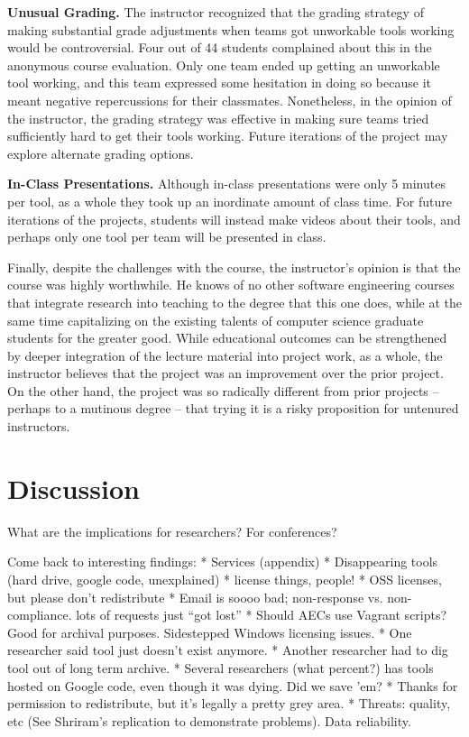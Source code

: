 \documentclass[10pt,conference]{IEEEtran}
\begin{document}
\textbf{Unusual Grading.} 
	The instructor recognized that the grading strategy of making substantial
	grade adjustments when teams got unworkable tools working would be 
	controversial.
	Four out of 44 students complained about this in the anonymous course
	evaluation.
	Only one team ended up getting an unworkable tool working, and this team expressed
	some hesitation in doing so because it meant negative repercussions for their
	classmates.
	Nonetheless, in the opinion of the instructor, the grading strategy was effective
	in making sure teams tried sufficiently hard to get their tools working. 
 	Future iterations of the project may explore alternate grading options.

\textbf{In-Class Presentations.}
  	Although in-class presentations were only 5 minutes per tool, as a whole they
  	took up an inordinate amount of class time.
  	For future iterations of the projects, students will instead make videos 
  	about their tools, and perhaps only one tool per team will be presented
  	in class.
 
\vspace{3mm}
Finally, despite the challenges with the course, the instructor's opinion is that 
the course was highly worthwhile.
He knows of no other software engineering courses that integrate research into 
teaching to the degree that this one does, while at the same time capitalizing
on the existing talents of computer science graduate students for the greater 
good.
While educational outcomes can be strengthened by deeper integration of the lecture
material into project work, as a whole, the instructor believes that 
the project was an improvement over the prior project.
On the other hand, the project was so radically different from prior 
projects -- perhaps to a mutinous degree -- that trying it is a risky 
proposition for untenured instructors.

\section{Discussion}

What are the implications for researchers? For conferences?

Come back to interesting findings:
* Services (appendix)
* Disappearing tools (hard drive, google code, unexplained)
* license things, people!
* OSS licenses, but please don't redistribute
* Email is soooo bad; non-response vs. non-compliance. lots of requests just ``got lost''
* Should AECs use Vagrant scripts? Good for archival purposes. Sidestepped Windows licensing issues.
* One researcher said tool just doesn't exist anymore.
* Another researcher had to dig tool out of long term archive.
* Several researchers (what percent?) has tools hosted on Google code, even though it was dying. Did we save 'em?
* Thanks for permission to redistribute, but it's legally a pretty grey area.
* Threats: quality, etc (See Shriram's replication to demonstrate problems). Data reliability.
\end{document}
